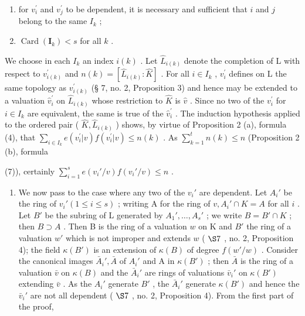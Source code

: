 \begin{enumerate}
\def\labelenumi{(\roman{enumi})}
\item
  for \(v_{i}^{\prime}\) and \(v_{j}^{\prime}\) to be dependent, it is necessary and sufficient that \(i\) and \(j\) belong to the same \(I_{k}\) ;
\item
  \(\operatorname{Card}(\mathbf{I}_k) < s\) for all \(k\) .
\end{enumerate}

We choose in each \(I_{k}\) an index \(i(k)\) . Let \(\hat{L}_{i(k)}\) denote the completion of L with respect to \(v_{i(k)}^{\prime}\) and \(n(k) = [\hat{L}_{i(k)} : \hat{K}]\) . For all \(i \in I_{k}\) , \(v_{i}^{\prime}\) defines on L the same topology as \(v_{i(k)}^{\prime}\) (§ 7, no. 2, Proposition 3) and hence may be extended to a valuation \(\hat{v}_{i}^{\prime}\) on \(\hat{L}_{i(k)}\) whose restriction to \(\hat{K}\) is \(\hat{v}\) . Since no two of the \(v_{i}^{\prime}\) for \(i \in I_{k}\) are equivalent, the same is true of the \(\hat{v}_{i}^{\prime}\) . The induction hypothesis applied to the ordered pair ( \(\hat{K}, \hat{L}_{i(k)}\) ) shows, by virtue of Proposition 2 (a), formula (4), that \(\sum_{i\in I_k}e(v_i^{\prime}|v)f(v_i^{\prime}|v)\leqslant n(k)\) . As \(\sum_{k = 1}^{t}n(k)\leqslant n\) (Proposition 2 (b), formula

(7)), certainly \(\sum_{i=1}^{s} e(v_i'/v) f(v_i'/v) \leqslant n\) .

\begin{enumerate}
\def\labelenumi{(\arabic{enumi})}
\setcounter{enumi}{1}
\tightlist
\item
  We now pass to the case where any two of the \(v_i'\) are dependent. Let \(A_i'\) be the ring of \(v_i' (1 \leqslant i \leqslant s)\) ; writing A for the ring of \(v, A_i' \cap K = A\) for all \(i\) . Let \(B'\) be the subring of L generated by \(A_1', \ldots, A_s'\) ; we write \(B = B' \cap K\) ; then \(B \supset A\) . Then B is the ring of a valuation \(w\) on K and \(B'\) the ring of a valuation \(w'\) which is not improper and extends \(w\) ( \(\S 7\) , no. 2, Proposition 4); the field \(\kappa(B')\) is an extension of \(\kappa(B)\) of degree \(f(w'/w)\) . Consider the canonical images \(\bar{A}_i', \bar{A}\) of \(A_i'\) and A in \(\kappa(B')\) ; then \(\bar{A}\) is the ring of a valuation \(\bar{v}\) on \(\kappa(B)\) and the \(\bar{A}_i'\) are rings of valuations \(\bar{v}_i'\) on \(\kappa(B')\) extending \(\bar{v}\) . As the \(A_i'\) generate \(B'\) , the \(\bar{A}_i'\) generate \(\kappa(B')\) and hence the \(\bar{v}_i'\) are not all dependent ( \(\S 7\) , no. 2, Proposition 4). From the first part of the proof,
\end{enumerate}

